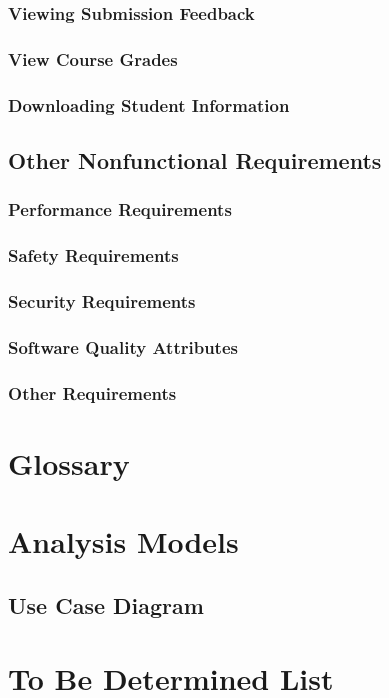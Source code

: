 \documentclass{article}
\begin{document}
\subsubsection{Viewing Submission Feedback}

\subsubsection{View Course Grades}



\subsubsection{Downloading Student Information}

\subsection{Other Nonfunctional Requirements}

\subsubsection{Performance Requirements}

\subsubsection{Safety Requirements}

\subsubsection{Security Requirements}

\subsubsection{Software Quality Attributes}


\subsubsection{Other Requirements}

\newpage
\appendix


\section{Glossary}


\section{Analysis Models}

\subsection{Use Case Diagram}

\section{To Be Determined List}
\end{document}
